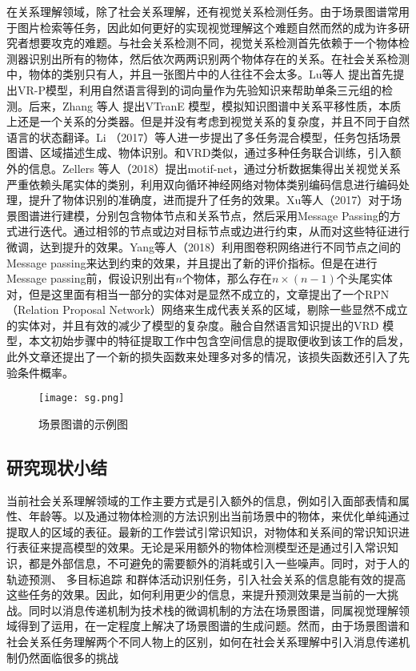 在关系理解领域，除了社会关系理解，还有视觉关系检测任务。由于场景图谱常用于图片检索\cite{johnson2015image}等任务，因此如何更好的实现视觉理解这个难题自然而然的成为许多研究者想要攻克的难题。与社会关系检测不同，视觉关系检测首先依赖于一个物体检测器识别出所有的物体，然后依次两两识别两个物体存在的关系。在社会关系检测中，物体的类别只有人，并且一张图片中的人往往不会太多。Lu等人\cite{lu2016visual} 提出首先提出VR-P模型，利用自然语言得到的词向量作为先验知识来帮助单条三元组的检测。后来，Zhang 等人\cite{zhang2017visual} 提出VTranE 模型，模拟知识图谱中关系平移性质，本质上还是一个关系的分类器。但是并没有考虑到视觉关系的复杂度，并且不同于自然语言的状态翻译。Li （2017）等人\cite{li2017scene}进一步提出了多任务混合模型，任务包括场景图谱、区域描述生成、物体识别。和VRD类似，通过多种任务联合训练，引入额外的信息。Zellers 等人（2018）\cite{zellers2018neural}提出motif-net，通过分析数据集得出关视觉关系严重依赖头尾实体的类别，利用双向循环神经网络对物体类别编码信息进行编码处理，提升了物体识别的准确度，进而提升了任务的效果。Xu等人（2017）对于场景图谱进行建模，分别包含物体节点和关系节点，然后采用Message Passing的方式进行迭代。通过相邻的节点或边对目标节点或边进行约束，从而对这些特征进行微调，达到提升的效果。Yang等人（2018）利用图卷积网络进行不同节点之间的Message passing来达到约束的效果，并且提出了新的评价指标。但是在进行Message passing前，假设识别出有$n$个物体，那么存在$n \times (n-1)$个头尾实体对，但是这里面有相当一部分的实体对是显然不成立的，文章提出了一个RPN（Relation Proposal Network）网络来生成代表关系的区域，剔除一些显然不成立的实体对，并且有效的减少了模型的复杂度。融合自然语言知识提出的VRD 模型\cite{liang2018visual}，本文初始步骤中的特征提取工作中包含空间信息的提取便收到该工作的启发，此外文章还提出了一个新的损失函数来处理多对多的情况，该损失函数还引入了先验条件概率。

\begin{figure}[htpb]
	\centering
	\texttt{[image: sg.png]}
    \caption{场景图谱\cite{xu2017scene}的示例图}
	\vspace*{-3.5mm}
	\label{fig:sg-example}
\end{figure}

\subsection{研究现状小结}
当前社会关系理解领域的工作主要方式是引入额外的信息，例如引入面部表情和属性、年龄等。以及通过物体检测的方法识别出当前场景中的物体，来优化单纯通过提取人的区域的表征。最新的工作尝试引常识知识，对物体和关系间的常识知识进行表征来提高模型的效果。无论是采用额外的物体检测模型还是通过引入常识知识，都是外部信息，不可避免的需要额外的消耗或引入一些噪声。同时，对于人的轨迹预测、 多目标追踪 和群体活动识别任务，引入社会关系的信息能有效的提高这些任务的效果。因此，如何利用更少的信息，来提升预测效果是当前的一大挑战。同时以消息传递机制为技术栈的微调机制的方法在场景图谱，同属视觉理解领域得到了运用，在一定程度上解决了场景图谱的生成问题。然而，由于场景图谱和社会关系任务理解两个不同人物上的区别，如何在社会关系理解中引入消息传递机制仍然面临很多的挑战

